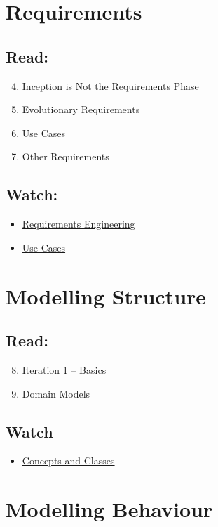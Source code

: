 \documentclass[10pt,t,a4paper]{article}
\begin{document}
\section{Requirements}
\label{sec-3}
\subsection{Read:}
\label{sec-3-1}
\begin{enumerate}
\setcounter{enumi}{3}
\item Inception is Not the Requirements Phase
\item Evolutionary Requirements
\item Use Cases
\item Other Requirements
\end{enumerate}

\subsection{Watch:}
\label{sec-3-2}
\begin{itemize}
\item \href{https://play.bth.se/media/Requirements+Engineering/1_epma2li8/41750261}{Requirements Engineering}
\item \href{https://play.bth.se/media/Use+Cases/1_d4tqygel/41750261}{Use Cases}
\end{itemize}
\section{Modelling Structure}
\label{sec-4}
\subsection{Read:}
\label{sec-4-1}
\begin{enumerate}
\setcounter{enumi}{7}
\item Iteration 1 -- Basics
\item Domain Models
\end{enumerate}

\subsection{Watch}
\label{sec-4-2}
\begin{itemize}
\item \href{https://play.bth.se/media/Concept+and+Classes/1_m237spjq/41750261}{Concepts and Classes}
\end{itemize}
\section{Modelling Behaviour}
\label{sec-5}
\end{document}
